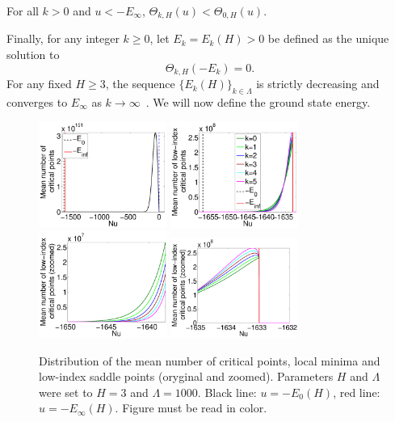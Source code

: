 \documentclass[twoside]{article}
\begin{document}
\begin{corollary}
For all $k > 0$ and $u < -E_{\infty}$, $\Theta_{k,H}(u) < \Theta_{0,H}(u)$.
\label{cor:Theta}
\end{corollary}
Finally, for any integer $k \geq 0$, let $E_k = E_k(H) > 0 $ be defined as the unique solution to 
\[\Theta_{k,H}(-E_k) = 0.
\]
For any fixed $H \geq 3$, the sequence $\{E_k(H)\}_{k\in\mathbb{\Lambda}}$ is strictly decreasing and converges to $E_{\infty}$ as $k \rightarrow \infty$~\cite{AAC2010}. We will now define the ground state energy.

\begin{figure}[htp!]
  \center
\includegraphics[width = 1.65in]{Distr_cp.pdf}
\includegraphics[width = 1.65in]{Distr_lm_sp_li.pdf} 
\includegraphics[width = 1.65in]{Distr_lm_sp_li_zoomed_left.pdf} 
\includegraphics[width = 1.65in]{Distr_lm_sp_li_zoomed_right.pdf} 
\vspace{-0.3in}
\caption{Distribution of the mean number of critical points, local minima and low-index saddle points (oryginal and zoomed). Parameters $H$ and $\Lambda$ were set to $H = 3$ and $\Lambda = 1000$. Black line: $u = -E_0(H)$, red line: $u = -E_{\infty}(H)$. Figure must be read in color.}
\label{fig:Distr_cp_lm_sp}
\vspace{-0.1in}
\end{figure}
\end{document}
